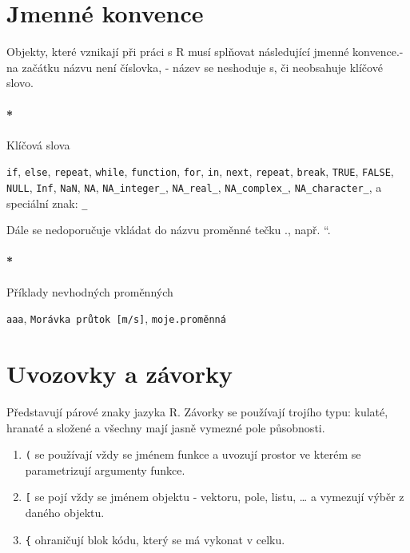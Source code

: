 \documentclass[
  letterpaper,
  DIV=11,
  numbers=noendperiod]{scrreprt}
\let\oldparagraph\paragraph
\renewcommand{\paragraph}[1]{\oldparagraph{#1}\mbox{}}
\providecommand{\tightlist}{%
  \setlength{\itemsep}{0pt}\setlength{\parskip}{0pt}}\usepackage{longtable,booktabs,array}
\begin{document}
\hypertarget{jmennuxe9-konvence}{%
\section{Jmenné konvence}\label{jmennuxe9-konvence}}

Objekty, které vznikají při práci s R musí splňovat následující jmenné
konvence.- na začátku názvu není číslovka, - název se neshoduje s, či
neobsahuje klíčové slovo.

\hypertarget{kluxedux10dovuxe1-slova}{%
\paragraph*{Klíčová slova}\label{kluxedux10dovuxe1-slova}}

\texttt{if}, \texttt{else}, \texttt{repeat}, \texttt{while},
\texttt{function}, \texttt{for}, \texttt{in}, \texttt{next},
\texttt{repeat}, \texttt{break}, \texttt{TRUE}, \texttt{FALSE},
\texttt{NULL}, \texttt{Inf}, \texttt{NaN}, \texttt{NA},
\texttt{NA\_integer\_}, \texttt{NA\_real\_}, \texttt{NA\_complex\_},
\texttt{NA\_character\_}, a speciální znak: \texttt{\_}

Dále se nedoporučuje vkládat do názvu proměnné tečku ., např. ``.

\hypertarget{pux159uxedklady-nevhodnuxfdch-promux11bnnuxfdch}{%
\paragraph*{Příklady nevhodných
proměnných}\label{pux159uxedklady-nevhodnuxfdch-promux11bnnuxfdch}}

\texttt{aaa}, \texttt{Morávka\ průtok\ {[}m/s{]}},
\texttt{moje.proměnná}

\hypertarget{uvozovky-a-zuxe1vorky}{%
\section{Uvozovky a závorky}\label{uvozovky-a-zuxe1vorky}}

Představují párové znaky jazyka R. Závorky se používají trojího typu:
kulaté, hranaté a složené a všechny mají jasně vymezné pole působnosti.

\begin{enumerate}
\def\labelenumi{\arabic{enumi}.}
\tightlist
\item
  \texttt{(} se používají vždy se jménem funkce a uvozují prostor ve
  kterém se parametrizují argumenty funkce.\\
\item
  \texttt{{[}} se pojí vždy se jménem objektu - vektoru, pole, listu,
  \ldots{} a vymezují výběr z daného objektu.\\
\item
  \texttt{\{} ohraničují blok kódu, který se má vykonat v celku.\\
\end{enumerate}
\end{document}

